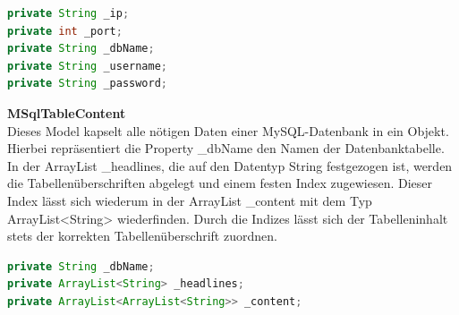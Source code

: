 \begin{lstlisting}[caption=Parameter für eine MySQL-Datenbankverbindung, language=Java]
private String _ip;
private int _port;
private String _dbName;
private String _username;
private String _password;
\end{lstlisting}

\textbf{MSqlTableContent}\\
Dieses Model kapselt alle nötigen Daten einer MySQL-Datenbank in ein Objekt. Hierbei repräsentiert die Property {\_}dbName den Namen der Datenbanktabelle. In der ArrayList {\_}headlines, die auf den Datentyp {\frqq}String{\flqq} festgezogen ist, werden die Tabellenüberschriften abgelegt und einem festen Index zugewiesen. Dieser Index lässt sich wiederum in der ArrayList {\_}content mit dem Typ ArrayList<String> wiederfinden. Durch die Indizes lässt sich der Tabelleninhalt stets der korrekten Tabellenüberschrift zuordnen.

\begin{lstlisting}[caption=Repräsentation einer MySQL-Tabelle als Java-Objekt, language=Java]
private String _dbName;
private ArrayList<String> _headlines;
private ArrayList<ArrayList<String>> _content;
\end{lstlisting}

